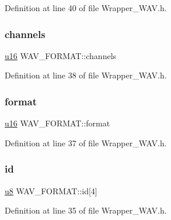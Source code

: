 Definition at line 40 of file Wrapper\+\_\+\+W\+A\+V.\+h.

\mbox{\label{struct_w_a_v___f_o_r_m_a_t_a770422b2ee3c7cd4088f7ab1a39e5d5e}} 
\subsubsection{\texorpdfstring{channels}{channels}}
{\footnotesize\ttfamily \mbox{\hyperlink{_util_8h_a9e6c91d77e24643b888dbd1a1a590054}{u16}} W\+A\+V\+\_\+\+F\+O\+R\+M\+A\+T\+::channels}



Definition at line 38 of file Wrapper\+\_\+\+W\+A\+V.\+h.

\mbox{\label{struct_w_a_v___f_o_r_m_a_t_ac134cc6cea6c862472878750b8a58071}} 
\subsubsection{\texorpdfstring{format}{format}}
{\footnotesize\ttfamily \mbox{\hyperlink{_util_8h_a9e6c91d77e24643b888dbd1a1a590054}{u16}} W\+A\+V\+\_\+\+F\+O\+R\+M\+A\+T\+::format}



Definition at line 37 of file Wrapper\+\_\+\+W\+A\+V.\+h.

\mbox{\label{struct_w_a_v___f_o_r_m_a_t_af7e4d036ae594f619322a763fc446ff7}} 
\subsubsection{\texorpdfstring{id}{id}}
{\footnotesize\ttfamily \mbox{\hyperlink{_util_8h_aed742c436da53c1080638ce6ef7d13de}{u8}} W\+A\+V\+\_\+\+F\+O\+R\+M\+A\+T\+::id\mbox{[}4\mbox{]}}



Definition at line 35 of file Wrapper\+\_\+\+W\+A\+V.\+h.

